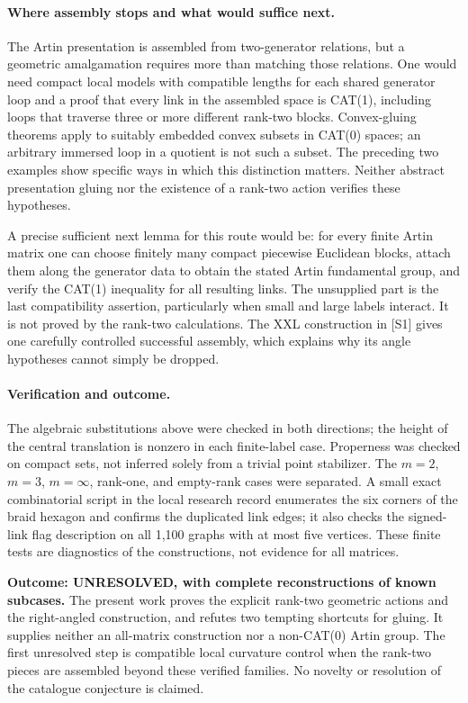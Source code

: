 \documentclass[11pt]{article}
\begin{document}
\paragraph{Where assembly stops and what would suffice next.}
The Artin presentation is assembled from two-generator relations, but a
geometric amalgamation requires more than matching those relations.
One would need compact local models with compatible lengths for each shared
generator loop and a proof that every link in the assembled space is CAT(1),
including loops that traverse three or more different rank-two blocks.
Convex-gluing theorems apply to suitably embedded convex subsets in CAT(0)
spaces; an arbitrary immersed loop in a quotient is not such a subset.
The preceding two examples show specific ways in which this distinction
matters. Neither abstract presentation gluing nor the existence of a
rank-two action verifies these hypotheses.

A precise sufficient next lemma for this route would be: for every finite
Artin matrix one can choose finitely many compact piecewise Euclidean
blocks, attach them along the generator data to obtain the stated Artin
fundamental group, and verify the CAT(1) inequality for all resulting
links. The unsupplied part is the last compatibility assertion, particularly
when small and large labels interact. It is not proved by the rank-two
calculations. The XXL construction in [S1] gives one carefully controlled
successful assembly, which explains why its angle hypotheses cannot simply
be dropped.

\paragraph{Verification and outcome.}
The algebraic substitutions above were checked in both directions; the
height of the central translation is nonzero in each finite-label case.
Properness was checked on compact sets, not inferred solely from a trivial
point stabilizer. The $m=2$, $m=3$, $m=\infty$, rank-one, and empty-rank
cases were separated. A small exact combinatorial script in the local
research record enumerates the six corners of the braid hexagon and
confirms the duplicated link edges; it also checks the signed-link flag
description on all 1,100 graphs with at most five vertices. These finite tests
are diagnostics of the constructions, not evidence for all matrices.

\textbf{Outcome: UNRESOLVED, with complete reconstructions of known subcases.}
The present work proves the explicit rank-two geometric actions and the
right-angled construction, and refutes two tempting shortcuts for gluing.
It supplies neither an all-matrix construction nor a non-CAT(0) Artin group.
The first unresolved step is compatible local curvature control when the
rank-two pieces are assembled beyond these verified families. No novelty
or resolution of the catalogue conjecture is claimed.
\end{document}
